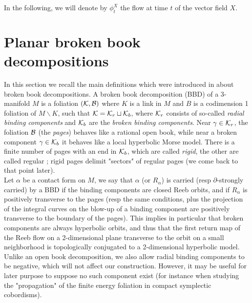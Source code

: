 \documentclass[../main.tex]{subfiles}
\begin{document}
In the following, we will denote by $\phi_t^X$ the flow at time $t$ of the vector field $X$.




\section{Planar broken book decompositions}

In this section we recall the main definitions which were introduced in \cite{colin_existence_2022} about broken book decompositions. A broken book decomposition (BBD) of a 3-manifold $M$ is a foliation $(\mathcal{K},\mathcal{B})$ where $K$ is a link in $M$ and $B$ is a codimension 1 foliation of $M\backslash K$, such that $\mathcal{K} = \mathcal{K}_r\sqcup \mathcal{K}_b$, where $\mathcal{K}_r$ consists of so-called \textit{radial binding components} and $\mathcal{K}_b$ are the \textit{broken binding components}. Near $\gamma\in \mathcal{K}_r$, the foliation $\mathcal{B}$ (the \textit{pages}) behaves like a rational open book, while near a broken component $\gamma\in\mathcal{K}_b$ it behaves like a local hyperbolic Morse model. There is a finite number of pages with an end in $\mathcal{K}_b$, which are called \textit{rigid}, the other are called regular ; rigid pages delimit "sectors" of regular pages (we come back to that point later).\\

Let $\alpha$ be a contact form on $M$, we say that $\alpha$ (or $R_\alpha$) is carried (resp $\partial$-strongly carried) by a BBD if the binding components are closed Reeb orbits, and if $R_\alpha$ is positively transverse to the pages (resp the same conditions, plus the projection of the integral curves on the blow-up of a binding component are positively transverse to the boundary of the pages). This implies in particular that broken components are always hyperbolic orbits, and thus that the first return map of the Reeb flow on a 2-dimensional plane transverse to the orbit on a small neighborhood is topologically conjugated to a 2-dimensional hyperbolic model. Unlike an open book decomposition, we also allow radial binding components to be negative, which will not affect our construction. However, it may be useful for later purpose to suppose no such component exist (for instance when studying the "propagation" of the finite energy foliation in compact symplectic cobordisms).\\
\end{document}
